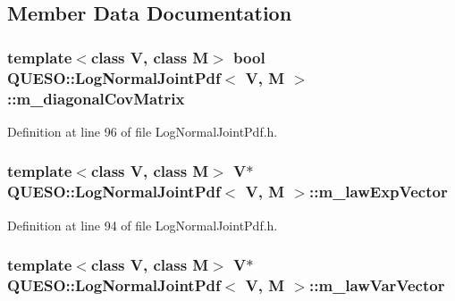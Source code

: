 \subsection{Member Data Documentation}
\hypertarget{class_q_u_e_s_o_1_1_log_normal_joint_pdf_a8c85380b9a7c7ab746b2c8cc9c9cf5ee}{
\subsubsection[{m\-\_\-diagonal\-Cov\-Matrix}]{\setlength{\rightskip}{0pt plus 5cm}template$<$class V, class M$>$ bool {\bf Q\-U\-E\-S\-O\-::\-Log\-Normal\-Joint\-Pdf}$<$ V, M $>$\-::m\-\_\-diagonal\-Cov\-Matrix\hspace{0.3cm}{\ttfamily [protected]}}}\label{class_q_u_e_s_o_1_1_log_normal_joint_pdf_a8c85380b9a7c7ab746b2c8cc9c9cf5ee}


Definition at line 96 of file Log\-Normal\-Joint\-Pdf.\-h.

\hypertarget{class_q_u_e_s_o_1_1_log_normal_joint_pdf_a1373e1737c3198b852fab05c77abea35}{
\subsubsection[{m\-\_\-law\-Exp\-Vector}]{\setlength{\rightskip}{0pt plus 5cm}template$<$class V, class M$>$ V$\ast$ {\bf Q\-U\-E\-S\-O\-::\-Log\-Normal\-Joint\-Pdf}$<$ V, M $>$\-::m\-\_\-law\-Exp\-Vector\hspace{0.3cm}{\ttfamily [protected]}}}\label{class_q_u_e_s_o_1_1_log_normal_joint_pdf_a1373e1737c3198b852fab05c77abea35}


Definition at line 94 of file Log\-Normal\-Joint\-Pdf.\-h.

\hypertarget{class_q_u_e_s_o_1_1_log_normal_joint_pdf_abb84bcddf99dc15b4432baac0fc29122}{
\subsubsection[{m\-\_\-law\-Var\-Vector}]{\setlength{\rightskip}{0pt plus 5cm}template$<$class V, class M$>$ V$\ast$ {\bf Q\-U\-E\-S\-O\-::\-Log\-Normal\-Joint\-Pdf}$<$ V, M $>$\-::m\-\_\-law\-Var\-Vector\hspace{0.3cm}{\ttfamily [protected]}}}\label{class_q_u_e_s_o_1_1_log_normal_joint_pdf_abb84bcddf99dc15b4432baac0fc29122}


